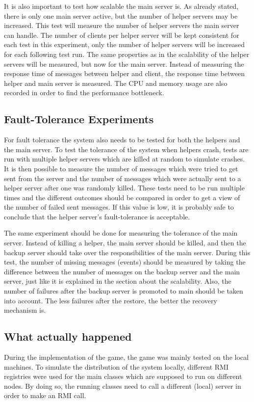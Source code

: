 It is also important to test how scalable the main server is. 
As already stated, there is only one main server active, but the number of helper servers may be increased.
This test will measure  the number of helper servers the main server can handle.
The number of clients per helper server will be kept consistent for each test in this experiment, only the number of helper servers will be increased for each following test run.
The same properties as in the scalability of the helper servers will be measured, but now for the main server.
Instead of measuring the response time of messages between helper and client, the response time between helper and main server is measured.
The CPU and memory usage are also recorded in order to find the performance bottleneck.

\subsection{Fault-Tolerance Experiments}
For fault tolerance the system also needs to be tested for both the helpers and the main server.
To test the tolerance of the system when helpers crash, tests are run with multiple helper servers which are killed at random to simulate crashes.
It is then possible to measure the number of messages which were tried to get sent from the server and the number of messages which were actually sent to a helper server after one was randomly killed.
These tests need to be run multiple times and the different outcomes should be compared in order to get a view of the number of failed sent messages.
If this value is low, it is probably safe to conclude that the helper server's fault-tolerance is acceptable.

The same experiment should be done for measuring the tolerance of the main server.
Instead of killing a helper, the main server should be killed, and then the backup server should take over the responsibilities of the main server.
During this test, the number of missing messages (events) should be measured by taking the difference between the number of messages on the backup server and the main server, just like it is explained in the section about the scalability.
Also, the number of failures after the backup server is promoted to main should be taken into account.
The less failures after the restore, the better the recovery mechanism is.

\subsection{What actually happened}
During the implementation of the game, the game was mainly tested on the local machines.
To simulate the distribution of the system locally, different RMI registries were used for the main classes which are supposed to run on different nodes.
By doing so, the running classes need to call a different (local) server in order to make an RMI call.

